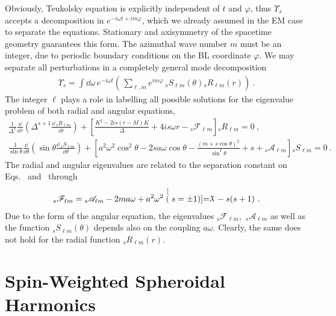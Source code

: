 Obviously, Teukolsky equation is explicitly independent of $t$ and $\varphi$, thus $\Upsilon_s$ accepts a decomposition in $e^{-i \omega t + i m \varphi}$, which we already assumed in the EM case to separate the equations.
Stationary and axisymmetry of the spacetime geometry guarantees this form.
The azimuthal wave number $m$ must be an integer, due to periodic boundary conditions on the BL coordinate $\varphi$.
We may separate all perturbations in a completely general mode decomposition
\begin{align}
    \label{eq3:multipoleExpansion}
    \Upsilon_s = \int\dd\omega \, e^{-i \omega t} \left( \,\sum_{\ell,m} e^{i m \varphi} \, {}_{s}S_{\ell m}(\theta) {}_{s}R_{\ell m}(r) \right) ~.
\end{align}
The integer $\ell$ plays a role in labelling all possible solutions for the eigenvalue problem of both radial and angular equations,
\begin{align}
    \label{eq3:teukolskyRadial}
    \frac{1}{\Delta^s} \frac{\dd}{\dd r} \left( \Delta^{s+1} \frac{\dd\, {}_{s}R_{\ell m}}{\dd r} \right)
    + \left[ \frac{K^2 - 2 i s (r-M)K}{\Delta} + 4 i s \omega r -{}_{s}\mathscr{F}_{\ell m}  \right] {}_{s}R_{\ell m} = 0 ~, \\[0.15cm]
    \label{eq3:teukolskyAngular}
    \frac{1}{\sin\theta} \frac{\dd}{\dd\theta} \left( \sin\theta \frac{\dd\, {}_{s}S_{\ell m}}{\dd \theta} \right)
    + \left[ a^2 \omega^2 \cos^2\theta - 2 s a \omega \cos\theta - \frac{(m + s \cos\theta)^2}{\sin^2\theta} + s + {}_{s}\mathscr{A}_{\ell m} \right] {}_{s}S_{\ell m}  = 0~.
\end{align}
The radial and angular eigenvalues are related to the separation constant on Eqs.~ and~ through
\begin{align}
    {}_{s}\mathscr{F}_{\ell m} = {}_{s}\mathscr{A}_{\ell m} - 2 m a \omega + a^2 \omega^2 \stackrel[(s=\pm 1)]{}{=} \lambdabar - s(s+1) ~.
    \label{eq3:relationEVs}
\end{align}
Due to the form of the angular equation, the eigenvalues ${}_{s}\mathscr{F}_{\ell m}$, \,${}_{s}\mathscr{A}_{\ell m}$ as well as the function ${}_{s}S_{\ell m}(\theta)$ depends also on the coupling $a \omega$.
Clearly, the same does not hold for the radial function ${}_{s}R_{\ell m}(r)$. 

\section{Spin-Weighted Spheroidal Harmonics}


